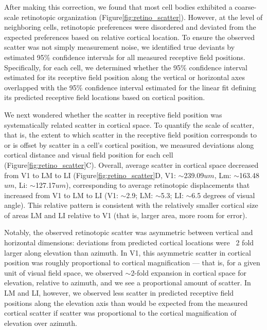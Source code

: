 After making this correction, we found that most cell bodies exhibited a coarse-scale retinotopic organization (Figure\ref{fig:retino_scatter}). However, at the level of neighboring cells, retinotopic preferences were disordered and deviated from the expected preferences based on relative cortical location. To ensure the observed scatter was not simply measurement noise, we identified true deviants by estimated 95\% confidence intervals for all measured receptive field positions. Specifically, for each cell, we determined whether the 95\% confidence interval estimated for its receptive field position along the vertical or horizontal axes overlapped with the 95\% confidence interval estimated for the linear fit defining its predicted receptive field locations based on cortical position.  


We next wondered whether the scatter in receptive field position was systematically related scatter in cortical space. To quantify the scale of scatter, that is, the extent to which scatter in the receptive field position corresponds to or is offset by scatter in a cell's cortical position, we measured deviations along cortical distance and visual field position for each cell (Figure\ref{fig:retino_scatter}C). Overall, average scatter in cortical space decreased from V1 to LM to LI (Figure\ref{fig:retino_scatter}D, V1: $\sim$239.09$um$, Lm: $\sim$163.48$um$, Li: $\sim$127.17$um$), corresponding to average retinotopic displacements that increased from V1 to LM to LI (V1: $\sim$2.9; LM: $\sim$5.3; LI: $\sim$6.5 degrees of visual angle). This relative pattern is consistent with the relatively smaller cortical size of areas LM and LI relative to V1 (that is, larger area, more room for error).  

Notably, the observed retinotopic scatter was asymmetric between vertical and horizontal dimensions:  deviations from predicted cortical locations were ~2 fold larger along elevation than azimuth. In V1, this asymmetric scatter in cortical position was roughly proportional to cortical magnification --- that is, for a given unit of visual field space, we observed $\sim$2-fold expansion in cortical space  for elevation, relative to azimuth, and we see a proportional amount of scatter. In LM and LI, however, we observed less scatter in predicted receptive field positions along the elevation axis than would be expected from the measured cortical scatter if scatter was proportional to the cortical magnification of elevation over azimuth.


